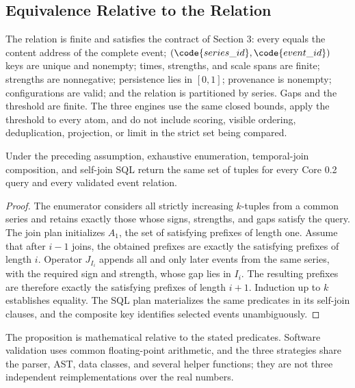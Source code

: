 \subsection{Equivalence Relative to the Relation}

\begin{assumption}
The relation is finite and satisfies the contract of Section 3: every  equals the content address of the complete event; $(\code{series\_id},\code{event\_id})$ keys are unique and nonempty; times, strengths, and scale spans are finite; strengths are nonnegative; persistence lies in $[0,1]$; provenance is nonempty; configurations are valid; and the relation is partitioned by series. Gaps and the threshold are finite. The three engines use the same closed bounds, apply the threshold to every atom, and do not include scoring, visible ordering, deduplication, projection, or limit in the strict set being compared.
\end{assumption}

\begin{proposition}
Under the preceding assumption, exhaustive enumeration, temporal-join composition, and self-join SQL return the same set of tuples for every Core 0.2 query and every validated event relation.
\end{proposition}

\begin{proof}
The enumerator considers all strictly increasing $k$-tuples from a common series and retains exactly those whose signs, strengths, and gaps satisfy the query. The join plan initializes $A_1$, the set of satisfying prefixes of length one. Assume that after $i-1$ joins, the obtained prefixes are exactly the satisfying prefixes of length $i$. Operator $J_{I_i}$ appends all and only later events from the same series, with the required sign and strength, whose gap lies in $I_i$. The resulting prefixes are therefore exactly the satisfying prefixes of length $i+1$. Induction up to $k$ establishes equality. The SQL plan materializes the same predicates in its self-join clauses, and the composite key identifies selected events unambiguously.
\end{proof}

The proposition is mathematical relative to the stated predicates. Software validation uses common floating-point arithmetic, and the three strategies share the parser, AST, data classes, and several helper functions; they are not three independent reimplementations over the real numbers.

